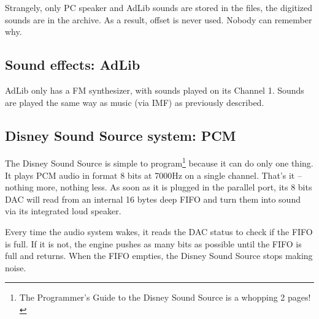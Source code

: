 \par
\begin{minipage}{\textwidth}

\end{minipage}
\par
Strangely, only PC speaker and AdLib sounds are stored in the  files, the digitized sounds are in the  archive. As a result, offset  is never used. Nobody can remember why.\\

\par



\subsection{Sound effects: AdLib}
AdLib only has a FM synthesizer, with sounds played on its Channel 1. Sounds are played the same way as music (via IMF) as previously described.












\subsection{Disney Sound Source system: PCM}
The Disney Sound Source is simple to program\footnote{The Programmer's Guide to the Disney Sound Source is a whopping 2 pages!} because it can do only one thing. It plays PCM audio in format 8 bits at 7000Hz on a single channel. That's it -- nothing more, nothing less. As soon as it is plugged in the parallel port, its 8 bits DAC will read from an internal 16 bytes deep FIFO and turn them into sound via its integrated loud speaker.\\ 
\par
Every time the audio system wakes, it reads the DAC status to check if the FIFO is full. If it is not, the engine pushes as many bits as possible until the FIFO is full and returns. When the FIFO empties, the Disney Sound Source stops making noise.\\
\par










\par

